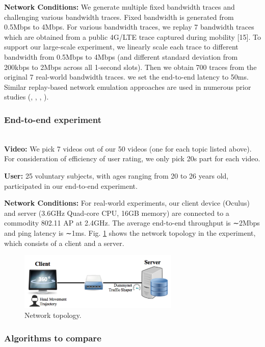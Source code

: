 \textbf{Network Conditions: } We generate multiple fixed bandwidth traces and challenging various bandwidth traces. Fixed bandwidth is generated from 0.5Mbps to 4Mbps. For various bandwidth traces, we replay 7 bandwidth traces which are obtained from a public 4G/LTE trace captured during mobility [15]. To support our large-scale experiment, we linearly scale each trace to different bandwidth from 0.5Mbps to 4Mbps (and different standard deviation from 200kbps to 2Mbps across all 1-second slots). Then we obtain 700 traces from the original 7 real-world bandwidth traces. we set the end-to-end latency to 50ms. Similar replay-based network emulation approaches are used in numerous prior studies (\cite{bandwidth1}, \cite{bandwidth2}, \cite{bandwidth3}, \cite{Flare}).

\subsubsection{End-to-end experiment}
~\\

\textbf{Video: } We pick 7 videos out of our 50 videos (one for each topic listed above). For consideration of efficiency of user rating, we only pick 20s part for each video.

\textbf{User: } 25 voluntary subjects, with ages ranging from 20 to 26 years old, participated in our end-to-end experiment.

\textbf{Network Conditions: } For real-world experiments, our client device (Oculus) and server (3.6GHz Quad-core CPU, 16GB memory) are connected to a commodity 802.11 AP at 2.4GHz. The average end-to-end throughput is ∼2Mbps and ping latency is ∼1ms. Fig. \ref{network} shows the network topology in the experiment, which consists of a client and a server.

\begin{figure}
  \centering
  \includegraphics[width=3in]{images/network.jpg}
  \caption{Network topology.}
  \label{network}
  \end{figure}

\subsubsection{Algorithms to compare}
~\\


